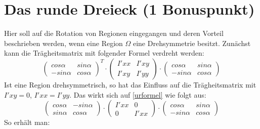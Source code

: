 \documentclass{ezb}
\begin{document}
\newpage
\section{Das runde Dreieck (1 Bonuspunkt)}
Hier soll auf die Rotation von Regionen eingegangen und deren Vorteil beschrieben werden, wenn eine Region $\Omega$ eine Drehsymmetrie besitzt. Zunächst kann die Trägheitsmatrix mit folgender Formel verdreht werden:\\
\begin{equation}
\begin{pmatrix}
cos \alpha & sin \alpha \\
-sin \alpha & cos \alpha 
\end{pmatrix}^{T}
\cdot
\begin{pmatrix}
I'xx & I'xy \\
I'xy & I'yy 
\end{pmatrix}
\cdot
\begin{pmatrix}
cos \alpha & sin \alpha \\
-sin \alpha & cos \alpha 
\end{pmatrix}
\label{urformel}
\end{equation}
\linebreak
Ist eine Region drehsymmetrisch, so hat das Einfluss auf die Trägheitsmatrix mit $I'xy = 0$, $I'xx = I'yy$. Das wirkt sich auf \eqref{urformel} wie folgt aus:\\
\begin{equation}
\begin{pmatrix}
cos \alpha & -sin \alpha \\
sin \alpha & cos \alpha 
\end{pmatrix}
\cdot
\begin{pmatrix}
I'xx & 0 \\
0 & I'xx 
\end{pmatrix}
\cdot
\begin{pmatrix}
cos \alpha & sin \alpha \\
-sin \alpha & cos \alpha 
\end{pmatrix}
\label{drehformel}
\end{equation}
\linebreak
So erhält man:\\
\end{document}
